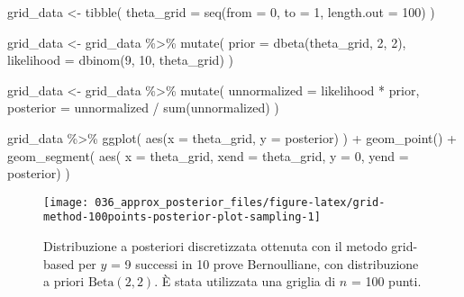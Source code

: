 \documentclass[
]{memoir}
\newenvironment{Shaded}{\begin{snugshade}}{\end{snugshade}}
\newcommand{\AttributeTok}[1]{\textcolor[rgb]{0.77,0.63,0.00}{#1}}
\newcommand{\DecValTok}[1]{\textcolor[rgb]{0.00,0.00,0.81}{#1}}
\newcommand{\FunctionTok}[1]{\textcolor[rgb]{0.00,0.00,0.00}{#1}}
\newcommand{\NormalTok}[1]{#1}
\newcommand{\OtherTok}[1]{\textcolor[rgb]{0.56,0.35,0.01}{#1}}
\newcommand{\SpecialCharTok}[1]{\textcolor[rgb]{0.00,0.00,0.00}{#1}}
\begin{document}
\begin{Shaded}
\begin{Highlighting}[]
\NormalTok{grid\_data  }\OtherTok{\textless{}{-}} \FunctionTok{tibble}\NormalTok{(}
  \AttributeTok{theta\_grid =} \FunctionTok{seq}\NormalTok{(}\AttributeTok{from =} \DecValTok{0}\NormalTok{, }\AttributeTok{to =} \DecValTok{1}\NormalTok{, }\AttributeTok{length.out =} \DecValTok{100}\NormalTok{)}
\NormalTok{)}

\NormalTok{grid\_data }\OtherTok{\textless{}{-}}\NormalTok{ grid\_data }\SpecialCharTok{\%\textgreater{}\%}
  \FunctionTok{mutate}\NormalTok{(}
    \AttributeTok{prior =} \FunctionTok{dbeta}\NormalTok{(theta\_grid, }\DecValTok{2}\NormalTok{, }\DecValTok{2}\NormalTok{),}
    \AttributeTok{likelihood =} \FunctionTok{dbinom}\NormalTok{(}\DecValTok{9}\NormalTok{, }\DecValTok{10}\NormalTok{, theta\_grid)}
\NormalTok{  )}

\NormalTok{grid\_data }\OtherTok{\textless{}{-}}\NormalTok{ grid\_data }\SpecialCharTok{\%\textgreater{}\%}
  \FunctionTok{mutate}\NormalTok{(}
    \AttributeTok{unnormalized =}\NormalTok{ likelihood }\SpecialCharTok{*}\NormalTok{ prior,}
    \AttributeTok{posterior =}\NormalTok{ unnormalized }\SpecialCharTok{/} \FunctionTok{sum}\NormalTok{(unnormalized)}
\NormalTok{  )}

\NormalTok{grid\_data }\SpecialCharTok{\%\textgreater{}\%} 
\FunctionTok{ggplot}\NormalTok{(}
  \FunctionTok{aes}\NormalTok{(}\AttributeTok{x =}\NormalTok{ theta\_grid, }\AttributeTok{y =}\NormalTok{ posterior)}
\NormalTok{) }\SpecialCharTok{+}
  \FunctionTok{geom\_point}\NormalTok{() }\SpecialCharTok{+}
  \FunctionTok{geom\_segment}\NormalTok{(}
    \FunctionTok{aes}\NormalTok{(}
      \AttributeTok{x =}\NormalTok{ theta\_grid, }
      \AttributeTok{xend =}\NormalTok{ theta\_grid, }
      \AttributeTok{y =} \DecValTok{0}\NormalTok{, }
      \AttributeTok{yend =}\NormalTok{ posterior)}
\NormalTok{  )}
\end{Highlighting}
\end{Shaded}

\begin{figure}

{\centering \texttt{[image: 036\_approx\_posterior\_files/figure-latex/grid-method-100points-posterior-plot-sampling-1]} 

}

\caption{Distribuzione a posteriori discretizzata ottenuta con il metodo grid-based per $y$ = 9 successi in 10 prove Bernoulliane, con distribuzione a priori $\mbox{Beta}(2, 2)$. È stata utilizzata una griglia di $n$ = 100 punti.}\label{fig:grid-method-100points-posterior-plot-sampling}
\end{figure}
\end{document}
